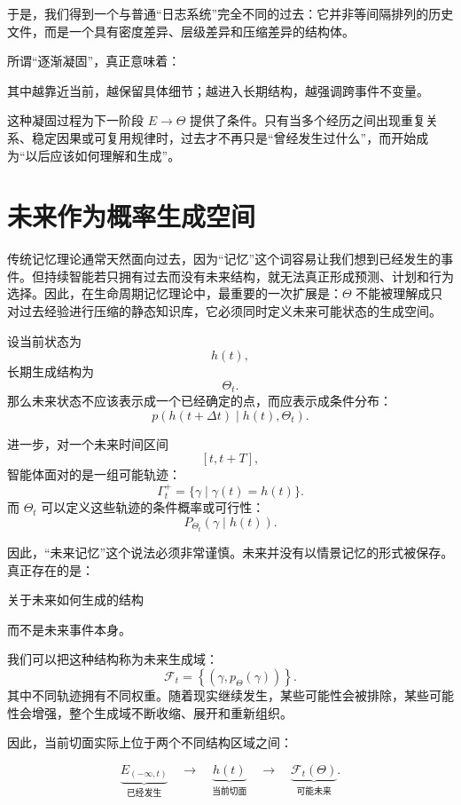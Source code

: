 于是，我们得到一个与普通“日志系统”完全不同的过去：它并非等间隔排列的历史文件，而是一个具有密度差异、层级差异和压缩差异的结构体。

所谓“逐渐凝固”，真正意味着：
\begin{statementbox}
\centering
{}
\end{statementbox}
其中越靠近当前，越保留具体细节；越进入长期结构，越强调跨事件不变量。

这种凝固过程为下一阶段 \(E\rightarrow\Theta\) 提供了条件。只有当多个经历之间出现重复关系、稳定因果或可复用规律时，过去才不再只是“曾经发生过什么”，而开始成为“以后应该如何理解和生成”。

\section{未来作为概率生成空间}

传统记忆理论通常天然面向过去，因为“记忆”这个词容易让我们想到已经发生的事件。但持续智能若只拥有过去而没有未来结构，就无法真正形成预测、计划和行为选择。因此，在生命周期记忆理论中，最重要的一次扩展是：\(\Theta\) 不能被理解成只对过去经验进行压缩的静态知识库，它必须同时定义未来可能状态的生成空间。

设当前状态为
\[
h(t),
\]
长期生成结构为
\[
\Theta_t.
\]
那么未来状态不应该表示成一个已经确定的点，而应表示成条件分布：
\[
p
\left(
h(t+\Delta t)
\mid
h(t),\Theta_t
\right).
\]

进一步，对一个未来时间区间
\[
[t,t+T],
\]
智能体面对的是一组可能轨迹：
\[
\Gamma^+_t
=
\{
\gamma
\mid
\gamma(t)=h(t)
\}.
\]
而 \(\Theta_t\) 可以定义这些轨迹的条件概率或可行性：
\[
P_{\Theta_t}
\left(
\gamma
\mid
h(t)
\right).
\]

因此，“未来记忆”这个说法必须非常谨慎。未来并没有以情景记忆的形式被保存。真正存在的是：
\begin{remark}
关于未来如何生成的结构
\end{remark}
而不是未来事件本身。

我们可以把这种结构称为未来生成域：
\[
\mathcal F_t
=
\left\{
(\gamma,p_\Theta(\gamma))
\right\}.
\]
其中不同轨迹拥有不同权重。随着现实继续发生，某些可能性会被排除，某些可能性会增强，整个生成域不断收缩、展开和重新组织。

因此，当前切面实际上位于两个不同结构区域之间：

\[
\underbrace{
E_{(-\infty,t)}
}_{\text{已经发生}}
\quad
\longrightarrow
\quad
\underbrace{
h(t)
}_{\text{当前切面}}
\quad
\longrightarrow
\quad
\underbrace{
\mathcal F_t(\Theta)
}_{\text{可能未来}}.
\]

